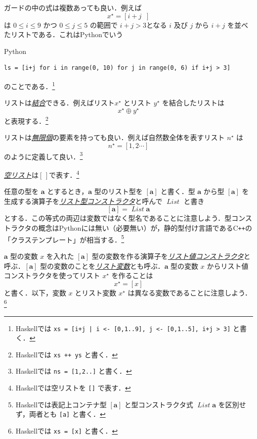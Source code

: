 \documentclass[a4paper]{jsbook}
\newcommand{\programminglanguage}[1]{\textsf{#1}}
\newcommand{\cxx}{\programminglanguage{C}\texttt{++}}
\newcommand{\haskell}{\programminglanguage{Haskell}}
\newcommand{\python}{\programminglanguage{Python}}
\newcommand{\keyword}[1]{{\underline{\emph{#1}}}}
\newcommand{\code}[1]{\texttt{#1}}
\newenvironment{pythoncode}{\begin{itembox}[r]{\python}}{\end{itembox}}
\newcommand{\mListWith}[1]{\left[#1\right]}
\newcommand{\mType}[1]{\mathbf{#1}}
\newcommand{\mListType}[1]{\mListWith{\mType{#1}}}
\newcommand{\mTypeConstructor}[1]{\mathit{#1}} %
\newcommand{\mEmptyList}{{[\,]}}
\newcommand{\mList}[1]{{#1}^\mathrm{\star}}
\newcommand{\mGuard}[1]{\mathop{\mid_{#1}}}
\DeclareMathOperator{\mAppend}{\oplus}
\DeclareMathOperator{\mFrom}{\in}
\DeclareMathOperator{\mListTypeConstructor}{\mTypeConstructor{List}}
\begin{document}
ガードの中の式は複数あっても良い．例えば
\begin{equation}
\mList{x}
=\mListWith{i+j\mGuard{i\mFrom\mListWith{0,1\dotsb9},\,j\mFrom\mListWith{0,1\dotsb5},\,i+j>3}}
\end{equation}
は $0\le i\le9$ かつ $0\le j\le5$ の範囲で $i+j>3$となる $i$ 及び $j$ から $i+j$ を並べたリストである．これは\python でいう
\begin{pythoncode}
\begin{verbatim}
ls = [i+j for i in range(0, 10) for j in range(0, 6) if i+j > 3]
\end{verbatim}
\end{pythoncode}
のことである．\footnote{\haskell では \code{xs = [i+j | i <- [0,1..9], j <- [0,1..5], i+j > 3]} と書く．}

リストは\keyword{結合}できる．例えばリスト$\mList{x}$ とリスト $\mList{y}$ を結合したリストは
\begin{equation}
\mList{x}\mAppend\mList{y}
\end{equation}
と表現する．\footnote{\haskell では \code{xs ++ ys} と書く．}

リストは\keyword{無限個}の要素を持っても良い．例えば自然数全体を表すリスト $\mList{n}$ は
\begin{equation}
\mList{n}=\mListWith{1,2\dotsb}
\end{equation}
のように定義して良い．\footnote{\haskell では \code{ns = [1,2..]} と書く．}

\keyword{空リスト}は$\mEmptyList$で表す．\footnote{\haskell では空リストを \code{[]} で表す．}

任意の型を $\mType{a}$ とするとき，$\mType{a}$ 型のリスト型を $\mListType{a}$ と書く．型 $\mType{a}$ から型 $\mListType{a}$ を生成する演算子を\keyword{リスト型コンストラクタ}と呼んで $\mListTypeConstructor$ と書き
\begin{equation}
\mListType{a}=\mListTypeConstructor\mType{a}
\end{equation}
とする．この等式の両辺は変数ではなく型名であることに注意しよう．型コンストラクタの概念は\python には無い（必要無い）が，静的型付け言語である\cxx の「クラステンプレート」が相当する．\footnote{\haskell では表記上コンテナ型 $\mListType{a}$ と型コンストラクタ式 $\mListTypeConstructor\mType{a}$ を区別せず，両者とも \code{[a]} と書く．}

$\mType{a}$ 型の変数 $x$ を入れた $\mListType{a}$ 型の変数を作る演算子を\keyword{リスト値コンストラクタ}と呼ぶ．$\mListType{a}$ 型の変数のことを\keyword{リスト変数}とも呼ぶ．$\mType{a}$ 型の変数 $x$ からリスト値コンストラクタを使ってリスト $\mList{x}$ を作ることは
\begin{equation}
\mList{x}=\mListWith{x}
\end{equation}
と書く．以下，変数 $x$ とリスト変数 $\mList{x}$ は異なる変数であることに注意しよう．\footnote{\haskell では \code{xs = [x]} と書く．}
\end{document}
